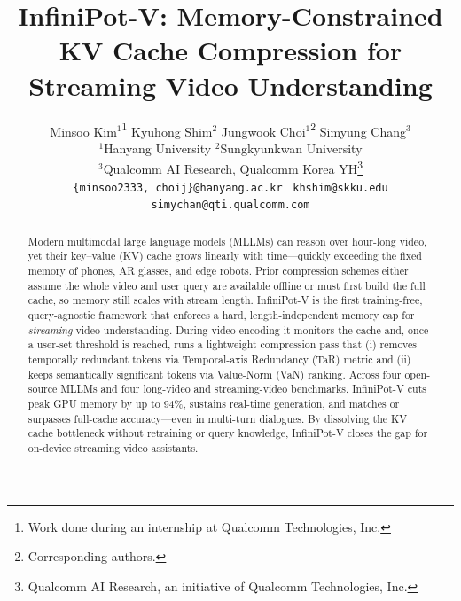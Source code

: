 \documentclass{article}
\title{InfiniPot-V: Memory-Constrained KV Cache Compression for Streaming Video Understanding }
\author{%
  \setcounter{footnote}{1}
  Minsoo Kim$^{1}$\thanks{Work done during an internship at Qualcomm Technologies, Inc.}\quad
  Kyuhong Shim$^{2}$\quad
  Jungwook Choi$^{1}$\thanks{Corresponding authors.}\quad
  Simyung Chang$^{3}$\footnotemark[3] \\
  $^{1}$Hanyang University \: $^{2}$Sungkyunkwan University \\
  $^{3}$Qualcomm AI Research, Qualcomm Korea YH\thanks{Qualcomm AI Research, an initiative of Qualcomm Technologies, Inc.} \\
  \texttt{\small\{minsoo2333, choij\}@hanyang.ac.kr} \,
  \texttt{\small khshim@skku.edu} \\
  \texttt{\small simychan@qti.qualcomm.com}
}
\begin{document}
\maketitle

\begin{abstract}
Modern multimodal large language models (MLLMs) can reason over hour-long video, yet their key–value (KV) cache grows linearly with time—quickly exceeding the fixed memory of phones, AR glasses, and edge robots. Prior compression schemes either assume the whole video and user query are available offline or must first build the full cache, so memory still scales with stream length. InfiniPot-V is the first training-free, query-agnostic framework that enforces a hard, length-independent memory cap for \textit{streaming} video understanding. During video encoding it monitors the cache and, once a user-set threshold is reached, runs a lightweight compression pass that (i) removes temporally redundant tokens via Temporal-axis Redundancy (TaR) metric and (ii) keeps semantically significant tokens via Value-Norm (VaN) ranking. Across four open-source MLLMs and four long-video and streaming-video benchmarks, InfiniPot-V cuts peak GPU memory by up to 94\%, sustains real-time generation, and matches or surpasses full-cache accuracy—even in multi-turn dialogues. By dissolving the KV cache bottleneck without retraining or query knowledge, InfiniPot-V closes the gap for on-device streaming video assistants.
\end{abstract}











\end{document}
